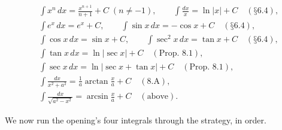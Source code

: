 \documentclass[a4paper,12pt,oneside]{memoir}
\begin{document}
\[ \begin{aligned}
    &\int x^{n}\,dx = \frac{x^{n+1}}{n+1} + C \;(n \ne -1), \qquad \int \frac{dx}{x} = \ln\lvert x\rvert + C \quad(\text{§6.4}), \\[2pt]
    &\int e^{x}\,dx = e^{x} + C, \qquad \int \sin x\,dx = -\cos x + C \quad(\text{§6.4}), \\[2pt]
    &\int \cos x\,dx = \sin x + C, \qquad \int \sec^{2}x\,dx = \tan x + C \quad(\text{§6.4}), \\[2pt]
    &\int \tan x\,dx = \ln\lvert\sec x\rvert + C \quad(\text{Prop.\ 8.1}), \\[2pt]
    &\int \sec x\,dx = \ln\lvert\sec x + \tan x\rvert + C \quad(\text{Prop.\ 8.1}), \\[2pt]
    &\int \frac{dx}{x^{2} + a^{2}} = \frac{1}{a}\arctan\frac{x}{a} + C \quad(\text{8.A}), \\[2pt]
    &\int \frac{dx}{\sqrt{a^{2} - x^{2}}} = \arcsin\frac{x}{a} + C \quad(\text{above}).
  \end{aligned} \]

We now run the opening’s four integrals through the strategy, in order.
\end{document}
